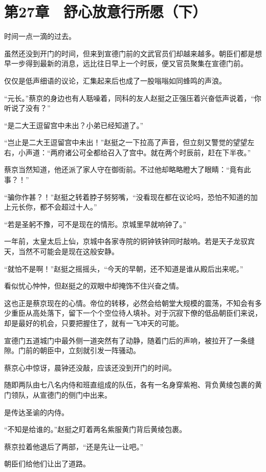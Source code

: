 \section{第27章　舒心放意行所愿（下）}

时间一点一滴的过去。

虽然还没到开门的时间，但来到宣德门前的文武官员们却越来越多。朝臣们都是想早一步得到最新的消息，远比往日早上一个时辰，便又官员聚集在宣德门前。

仅仅是低声细语的议论，汇集起来后也成了一股嗡嗡如同蜂鸣的声浪。

“元长。”蔡京的身边也有人聒噪着，同科的友人赵挺之正强压着兴奋低声说着，“你听说了没有？”

“是二大王逗留宫中未出？小弟已经知道了。”

“岂止是二大王逗留宫中未出！”赵挺之一下拉高了声音，但立刻又警觉的望望左右，小声道：“两府诸公可全都给召入了宫中。就在两个时辰前，赶在下半夜。”

蔡京当然知道，他还派了家人守在御街前。不过他却略略瞪大了眼睛：“竟有此事？！”

“骗你作甚？！”赵挺之转着脖子努努嘴，“没看现在都在议论吗，恐怕不知道的加上元长你，都不会超过十人。”

“若是圣躬不豫，可不是现在的情形。京城里早就响钟了。”

一年前，太皇太后上仙，京城中各家寺院的铜钟铁钟同时敲响。若是天子龙驭宾天，当然不可能会是现在这般安静。

“就怕不是啊！”赵挺之摇摇头，“今天的早朝，还不知道是谁从殿后出来呢。”

看似忧心忡忡，但赵挺之的双眼中却掩饰不住兴奋之情。

这也正是蔡京现在的心情。帝位的转移，必然会给朝堂大规模的震荡，不知会有多少重臣从高处落下，留下一个个空位待人填补。对于沉寂下僚的低品朝臣们来说，却是最好的机会，只要把握住了，就有一飞冲天的可能。

宣德门五道城门中最外侧一道突然有了动静，随着门后的声响，被拉开了一条缝隙。门前的朝臣中，立刻就引发一阵骚动。

蔡京心中惊讶，晨钟还没敲，应该还没到开门的时间。

随即两队由七八名内侍和班直组成的队伍，各有一名身穿紫袍、背负黄绫包裹的黄门领队，从宣德门的侧门中出来。

是传达圣谕的内侍。

“不知是给谁的。”赵挺之盯着两名紫服黄门背后黄绫包裹。

蔡京拉着他退后了两部，“还是先让一让吧。”

朝臣们给他们让出了道路。

